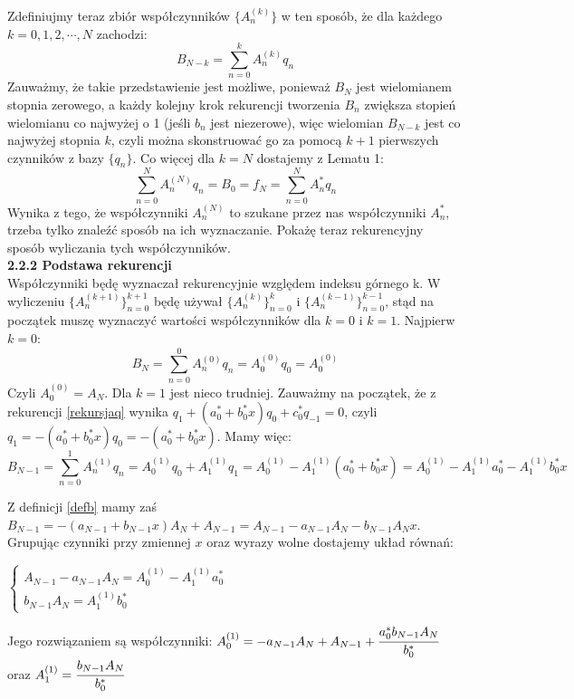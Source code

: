 \documentclass[a4paper]{article}
\begin{document}
Zdefiniujmy teraz zbiór współczynników $\{A_n^{(k)}\}$ w ten sposób, że dla każdego $k = 0,1,2,\cdots,N$ zachodzi:
\begin{equation}\label{defank}
B_{N-k} = \sum_{n=0}^{k} A_n^{(k)}q_n
\end{equation}
Zauważmy, że takie przedstawienie jest możliwe, ponieważ $B_N$ jest wielomianem stopnia zerowego, a każdy kolejny krok rekurencji tworzenia $B_n$ zwiększa stopień wielomianu co najwyżej o 1 (jeśli $b_n$ jest niezerowe), więc wielomian $B_{N-k}$ jest co najwyżej stopnia $k$, czyli można skonstruować go za pomocą $k+1$ pierwszych czynników z bazy $\{q_n\}$. Co więcej dla $k=N$ dostajemy z Lematu 1:
$$\sum_{n=0}^{N} A_n^{(N)}q_n = B_0 = f_N = \sum_{n=0}^{N} A_n^*q_n $$
Wynika z tego, że współczynniki $A_n^{(N)}$ to szukane przez nas współczynniki $A_n^*$, trzeba tylko znaleźć sposób na ich wyznaczanie. Pokażę teraz rekurencyjny sposób wyliczania tych współczynników.\\

\large
\textbf{2.2.2 Podstawa rekurencji}\\
\normalsize
Współczynniki będę wyznaczał rekurencyjnie względem indeksu górnego k. W wyliczeniu $\{A_n^{(k+1)}\}_{n=0}^{k+1}$ będę używał $\{A_n^{(k)}\}_{n=0}^k$ i  $\{A_n^{(k-1)}\}_{n=0}^{k-1}$, stąd na początek muszę wyznaczyć wartości współczynników dla $k=0$ i $k=1$. Najpierw $k=0$:
$$B_N = \sum_{n=0}^{0} A_n^{(0)}q_n = A_0^{(0)}q_0 = A_0^{(0)}$$
Czyli $A_0^{(0)} = A_N$. Dla $k=1$ jest nieco trudniej. Zauważmy na początek, że z rekurencji \eqref{rekursjaq} wynika $q_1 + (a_0^* + b_0^*x)q_0 + c_0^*q_{-1} = 0$, czyli $q_1 = -(a_0^* + b_0^*x)q_0 = -(a_0^* + b_0^*x)$. Mamy więc:
$$B_{N-1} = \sum_{n=0}^{1} A_n^{(1)}q_n =  A_0^{(1)}q_0 +  A_1^{(1)}q_1 =  A_0^{(1)} -  A_1^{(1)}(a_0^* + b_0^*x) = A_0^{(1)} - A_1^{(1)}a_0^* -A_1^{(1)}b_0^*x$$
\newpage

Z definicji \eqref{defb} mamy zaś $B_{N-1} = -(a_{N-1} + b_{N-1}x)A_N + A_{N-1} = A_{N-1} -a_{N-1}A_N - b_{N-1}A_Nx $. Grupując czynniki przy zmiennej $x$ oraz wyrazy wolne dostajemy układ równań:
\begin{center}
$\begin{cases} 
A_{N-1} -a_{N-1}A_N =  A_0^{(1)} - A_1^{(1)}a_0^*\\
b_{N-1}A_N  = A_1^{(1)}b_0^*
\end{cases}$
\end{center}
Jego rozwiązaniem są współczynniki: $A_0^{(1)} = -a_{N-1}A_N + A_{N-1} + \cfrac{a_0^*b_{N-1}A_N}{b_0^*}$ oraz $A_1^{(1)} = \cfrac{b_{N-1}A_N}{b_0^*}$\\
\end{document}
